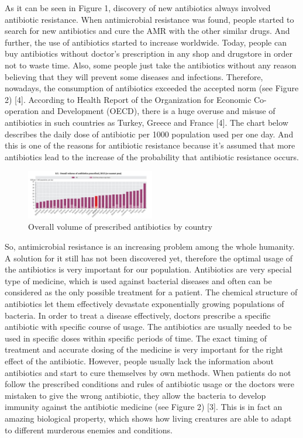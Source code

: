 As it can be seen in Figure 1, discovery of new antibiotics always involved antibiotic resistance. When antimicrobial resistance was found, people started to search for new antibiotics and cure the AMR with the other similar drugs. And further, the use of antibiotics started to increase worldwide. Today, people can buy antibiotics without doctor’s prescription in any shop and drugstore in order not to waste time. Also, some people just take the antibiotics without any reason believing that they will prevent some diseases and infections. Therefore, nowadays, the consumption of antibiotics exceeded the accepted norm (see Figure 2) [4]. According to Health Report of the Organization for Economic Co-operation and Development (OECD), there is a huge overuse and misuse of antibiotics in such countries as Turkey, Greece and France [4]. The chart below describes the daily dose of antibiotic per 1000 population used per one day. And this is one of the reasons for antibiotic resistance because it’s assumed that more antibiotics lead to the increase of the probability that antibiotic resistance occurs.

\begin{figure}[H]
  \centering
  \includegraphics[width=0.5\textwidth]{img/Fig2}
  \caption{Overall volume of prescribed antibiotics by country}
  \label{fig2}
\end{figure}

So, antimicrobial resistance is an increasing problem among the whole humanity. A solution for it still has not been discovered yet, therefore the optimal usage of the antibiotics is very important for our population. Antibiotics are very special type of medicine, which is used against bacterial diseases and often can be considered as the only possible treatment for a patient. The chemical structure of antibiotics let them effectively devastate exponentially growing populations of bacteria. In order to treat a disease effectively, doctors prescribe a specific antibiotic with specific course of usage. The antibiotics are usually needed to be used in specific doses within specific periods of time. The exact timing of treatment and accurate dosing of the medicine is very important for the right effect of the antibiotic. However, people usually lack the information about antibiotics and start to cure themselves by own methods. When patients do not follow the prescribed conditions and rules of antibiotic usage or the doctors were mistaken to give the wrong antibiotic, they allow the bacteria to develop immunity against the antibiotic medicine (see Figure 2) [3]. This is in fact an amazing biological property, which shows how living creatures are able to adapt to different murderous enemies and conditions.

